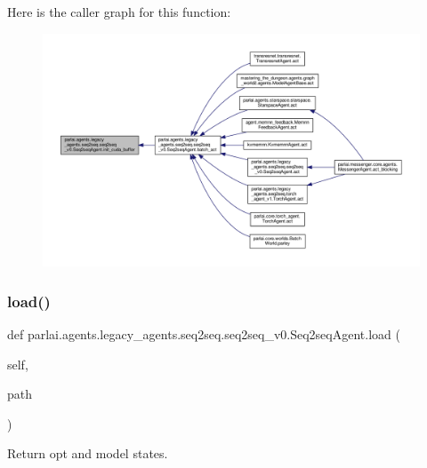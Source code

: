 Here is the caller graph for this function\+:
\nopagebreak
\begin{figure}[H]
\begin{center}
\leavevmode
\includegraphics[width=350pt]{classparlai_1_1agents_1_1legacy__agents_1_1seq2seq_1_1seq2seq__v0_1_1Seq2seqAgent_a9326d8ed88999a992b8ec73313c70a36_icgraph}
\end{center}
\end{figure}
\mbox{\label{classparlai_1_1agents_1_1legacy__agents_1_1seq2seq_1_1seq2seq__v0_1_1Seq2seqAgent_a2aabe1e56b7b94f46875ae7f704f681f}} 
\subsubsection{\texorpdfstring{load()}{load()}}
{\footnotesize\ttfamily def parlai.\+agents.\+legacy\+\_\+agents.\+seq2seq.\+seq2seq\+\_\+v0.\+Seq2seq\+Agent.\+load (\begin{DoxyParamCaption}\item[{}]{self,  }\item[{}]{path }\end{DoxyParamCaption})}

\begin{DoxyVerb}Return opt and model states.\end{DoxyVerb}
 

